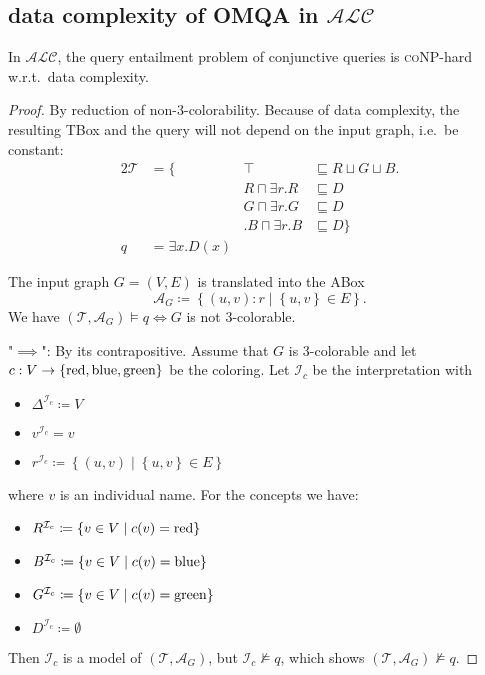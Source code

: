 \subsection{data complexity of OMQA in $\mathcal{ALC}$}
\medskip
\begin{prop}
	In $\mathcal{ALC}$, the query entailment problem of conjunctive queries is \textsc{coNP}-hard w.r.t.\ data complexity.
\end{prop}
\begin{proof}
	By reduction of non-3-colorability.
	Because of data complexity, the resulting TBox and the query will not depend on the input graph, i.e.\ be constant:
	\begin{alignat*}{2}
	\mathcal{T} &=\big\{&\top &\sqsubseteq R \sqcup G \sqcup B \big.\\
				&&R \sqcap \exists r.R &\sqsubseteq D\\
				&&G \sqcap \exists r.G &\sqsubseteq D\\
				&&\big. B \sqcap \exists r.B &\sqsubseteq D \big\}\\
		q &= \exists x. D(x)
	\end{alignat*}

	The input graph $G=(V,E)$ is translated into the ABox
	\[
		\mathcal{A}_G \coloneqq \left\{ (u,v):r \mid \left\{u,v\right\} \in E\right\}
	.\]
	We have $(\mathcal{T}, \mathcal{A}_G) \vDash q \iff G$ is not 3-colorable.
	
	"$\implies$": By its contrapositive.
	Assume that $G$ is 3-colorable and let $c: V \to \left\{ \mathit{\text{red}}, \mathit{\text{blue}}, \mathit{\text{green}} \right\}$ 
	be the coloring.
	Let $\mathcal{I}_c$ be the interpretation with
	\begin{itemize}
		\item $\Delta^{\mathcal{I}_c} \coloneqq V$
		\item $v^{\mathcal{I}_c} = v$ 
		\item $r^{\mathcal{I}_c} \coloneqq \left\{ (u,v) \mid \left\{ u, v \right\} \in E \right\}$
	\end{itemize}
	where $v$ is an individual name.
	For the concepts we have:
	\begin{itemize}
		\item $R^{\mathcal{I}_c} \coloneqq \left\{ v \in V \mid c(v) = \mathit{\text{red}}\right\}$
		\item $B^{\mathcal{I}_c} \coloneqq \left\{ v \in V \mid c(v) = \mathit{\text{blue}}\right\}$
		\item $G^{\mathcal{I}_c} \coloneqq \left\{ v \in V \mid c(v) = \mathit{\text{green}}\right\}$
		\item $D^{\mathcal{I}_c} \coloneqq \emptyset$
	\end{itemize}
	Then $\mathcal{I}_c$ is a model of $(\mathcal{T}, \mathcal{A}_G)$,
	but $\mathcal{I}_c \not\vDash q$, which shows $(\mathcal{T}, \mathcal{A}_G) \not\vDash q$.


\end{proof}
